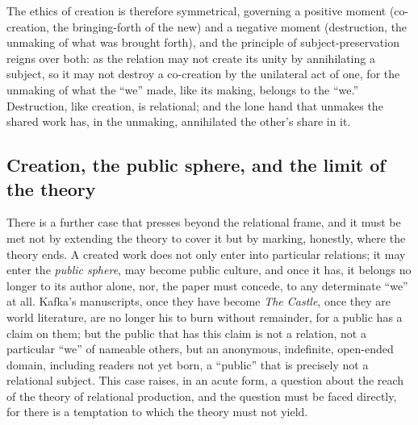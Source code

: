 The ethics of creation is therefore symmetrical, governing a positive moment (co-creation, the bringing-forth of the new) and a negative moment (destruction, the unmaking of what was brought forth), and the principle of subject-preservation reigns over both: as the relation may not create its unity by annihilating a subject, so it may not destroy a co-creation by the unilateral act of one, for the unmaking of what the ``we'' made, like its making, belongs to the ``we.'' Destruction, like creation, is relational; and the lone hand that unmakes the shared work has, in the unmaking, annihilated the other's share in it.

\subsection{Creation, the public sphere, and the limit of the theory}
\label{p21:sub:cr-public}

There is a further case that presses beyond the relational frame, and it must be met not by extending the theory to cover it but by marking, honestly, where the theory ends. A created work does not only enter into particular relations; it may enter the \emph{public sphere}, may become public culture, and once it has, it belongs no longer to its author alone, nor, the paper must concede, to any determinate ``we'' at all. Kafka's manuscripts, once they have become \emph{The Castle}, once they are world literature, are no longer his to burn without remainder, for a public has a claim on them; but the public that has this claim is not a relation, not a particular ``we'' of nameable others, but an anonymous, indefinite, open-ended domain, including readers not yet born, a ``public'' that is precisely not a relational subject. This case raises, in an acute form, a question about the reach of the theory of relational production, and the question must be faced directly, for there is a temptation to which the theory must not yield.

